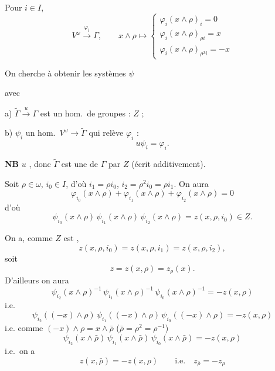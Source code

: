 \documentclass[11pt,a4paper]{article}
\begin{document}
Pour $i \in I$, \struck{\ill{}} \ill{}
\[
V^\omega \xrightarrow{\ \varphi_i\ } \Gamma, \qquad x \wedge \rho \longmapsto
\begin{cases}
\varphi_i(x \wedge \rho)_i = 0\\
\varphi_i(x \wedge \rho)_{\rho i} = x\\
\varphi_i(x \wedge \rho)_{\rho^2 i} = -x
\end{cases}
\]


On cherche à obtenir les systèmes $\psi$


avec

a) $\widetilde{\Gamma} \xrightarrow{u} \Gamma$ est un hom.\ de groupes :  \ill{}  $Z$ ;

b) $\psi_i$ un hom.\ $V^\omega \to \widetilde{\Gamma}$ qui relève $\varphi_i$ :
\[
u \psi_i = \varphi_i .
\]

\textbf{NB} $u$  \ill{}, donc $\widetilde{\Gamma}$ est une  de $\Gamma$ par $Z$ (écrit additivement).

Soit $\rho \in \omega$, $i_0 \in I$, d'où $i_1 = \rho i_0$, $i_2 = \rho^2 i_0 = \rho i_1$. On aura
\[
\varphi_{i_0}(x \wedge \rho) + \varphi_{i_1}(x \wedge \rho) + \varphi_{i_2}(x \wedge \rho) = 0
\]
d'où
\[
\psi_{i_0}(x \wedge \rho)\, \psi_{i_1}(x \wedge \rho)\, \psi_{i_2}(x \wedge \rho) = z(x, \rho, i_0) \in Z .
\]

On a, comme $Z$ est ,
\[
z(x, \rho, i_0) = z(x, \rho, i_1) = z(x, \rho, i_2),
\]
soit
\[
z = z(x, \rho) = z_\rho(x).
\]
D'ailleurs on aura
\[
\psi_{i_2}(x \wedge \rho)^{-1}\, \psi_{i_1}(x \wedge \rho)^{-1}\, \psi_{i_0}(x \wedge \rho)^{-1} = -z(x, \rho)
\]
i.e.
\[
\psi_{i_2}((-x) \wedge \rho)\, \psi_{i_1}((-x) \wedge \rho)\, \psi_{i_0}((-x) \wedge \rho) = -z(x, \rho)
\]
i.e.  comme $(-x) \wedge \rho = x \wedge \bar\rho$ \quad ($\bar\rho = \rho^2 = \rho^{-1}$)
\[
\psi_{i_2}(x \wedge \bar\rho)\, \psi_{i_1}(x \wedge \bar\rho)\, \psi_{i_0}(x \wedge \bar\rho) = -z(x, \rho)
\]
i.e.\ on a
\[
z(x, \bar\rho) = -z(x, \rho) \qquad \text{i.e.} \quad z_{\bar\rho} = -z_\rho
\]
\end{document}
